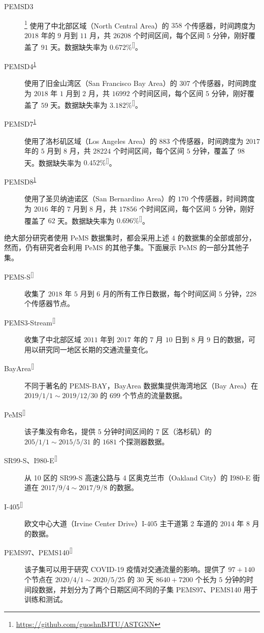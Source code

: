 \documentclass{ctexart}
\renewcommand{\cite}[1]{\textsuperscript{[\citenum{#1}]}}
\begin{document}
\begin{description}
    \item[PEMSD3]\footnote{\url{https://github.com/guoshnBJTU/ASTGNN}\label{pems0x}} 使用了中北部区域（North Central Area）的 $358$ 个传感器，时间跨度为 $2018$ 年的 $9$ 月到 $11$ 月，共 $26208$ 个时间区间，每个区间 $5$ 分钟，刚好覆盖了 $91$ 天。数据缺失率为 $0.672\%$\cite{dai_novel_2024}。
    \item[PEMSD4\textsuperscript{\ref{pems0x}}] 使用了旧金山湾区（San Francisco Bay Area）的 $307$ 个传感器，时间跨度为 $2018$ 年 $1$ 月到 $2$ 月，共 $16992$ 个时间区间，每个区间 $5$ 分钟，刚好覆盖了 $59$ 天。数据缺失率为 $3.182\%$\cite{dai_novel_2024}。
    \item[PEMSD7\textsuperscript{\ref{pems0x}}] 使用了洛杉矶区域（Los Angeles Area）的 $883$ 个传感器，时间跨度为 $2017$ 年的 $5$ 月到 $8$ 月，共 $28224$ 个时间区间，每个区间 $5$ 分钟，覆盖了 $98$ 天。数据缺失率为 $0.452\%$\cite{dai_novel_2024}。
    \item[PEMSD8\textsuperscript{\ref{pems0x}}] 使用了圣贝纳迪诺区（San Bernardino Area）的 $170$ 个传感器，时间跨度为 $2016$ 年的 $7$ 月到 $8$ 月，共 $17856$ 个时间区间，每个区间 $5$ 分钟，刚好覆盖了 $62$ 天。数据缺失率为 $0.696\%$\cite{dai_novel_2024}。
\end{description}

绝大部分研究者使用 PeMS 数据集时，都会采用上述 $4$ 的数据集的全部或部分，然而，仍有研究者会利用 PeMS 的其他子集。下面展示 PeMS 的一部分其他子集。

\begin{description}
    \item[PEMS-S\cite{zhang_spatio-temporal_2020}] 收集了 $2018$ 年 $5$ 月到 $6$ 月的所有工作日数据，每个时间区间 $5$ 分钟，$228$ 个传感器节点。%
    \item[PEMS3-Stream\cite{chen_trafficstream_2021}] 收集了中北部区域 $2011$ 年到 $2017$ 年的 $7$ 月 $10$ 日到 $8$ 月 $9$ 日的数据，可用以研究同一地区长期的交通流量变化。
    \item[BayArea\cite{guo_online_2024}] 不同于著名的 PEMS-BAY，BayArea 数据集提供海湾地区（Bay Area）在 $2019/1/1\sim 2019/12/30$ 的 $699$ 个节点的流量数据。
    \item[PeMS\cite{zhang_novel_2020}] 该子集没有命名，提供 $5$ 分钟时间区间的 7 区（洛杉矶）的 $205/1/1\sim 2015/5/31$ 的 $1681$ 个探测器数据。
    \item[SR99-S、I980-E\cite{liu_short-term_2017}] 从 10 区的 SR99-S 高速公路与 4 区奥克兰市（Oakland City）的 I980-E 街道在 $2017/9/4\sim2017/9/8$ 的数据。
    \item[I-405\cite{shao_traffic_2016}] 欧文中心大道（Irvine Center Drive）I-405 主干道第 2 车道的 $2014$ 年 $8$ 月的数据。
    \item[PEMS97、PEMS140\cite{li_traffic_2023}] 该子集可以用于研究 COVID-19 疫情对交通流量的影响。提供了 $97+140$ 个节点在 $2020/4/1\sim2020/5/25$ 的 $30$ 天 $8640+7200$ 个长为 $5$ 分钟的时间段数据，并划分为了两个日期区间不同的子集 PEMS97、PEMS140 用于训练和测试。
\end{description}
\end{document}

